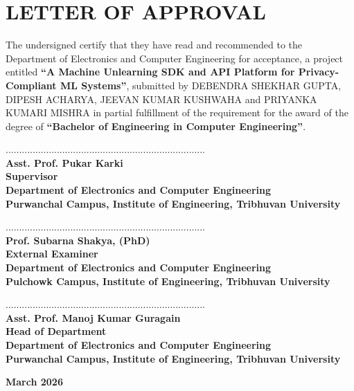 \chapter*{\textbf{LETTER OF APPROVAL}}
The undersigned certify that they have read and recommended to the Department of
Electronics and Computer Engineering for acceptance, a project entitled \textbf{``A Machine Unlearning SDK and API Platform for Privacy-Compliant ML Systems''}, submitted by {DEBENDRA SHEKHAR GUPTA, DIPESH ACHARYA, JEEVAN KUMAR KUSHWAHA and PRIYANKA KUMARI MISHRA} in partial fulfillment of the requirement for the award of the degree of \textbf{``Bachelor of Engineering in Computer Engineering''}.

\vspace{0.8cm}
..........................................................................\\
\textbf{Asst. Prof. Pukar Karki\\
Supervisor\\
Department of Electronics and Computer Engineering\\
Purwanchal Campus, Institute of Engineering, Tribhuvan University}

\vspace{1cm}
..........................................................................\\
\textbf{Prof. Subarna Shakya, (PhD)\\
External Examiner\\
Department of Electronics and Computer Engineering\\
Pulchowk Campus, Institute of Engineering, Tribhuvan University}

\vspace{1cm}
..........................................................................\\
\textbf{Asst. Prof. Manoj Kumar Guragain\\
Head of Department\\
Department of Electronics and Computer Engineering\\
Purwanchal Campus, Institute of Engineering, Tribhuvan University}

\vspace{2cm}
\begin{center}
\textbf{March 2026}
\end{center}
\newpage
